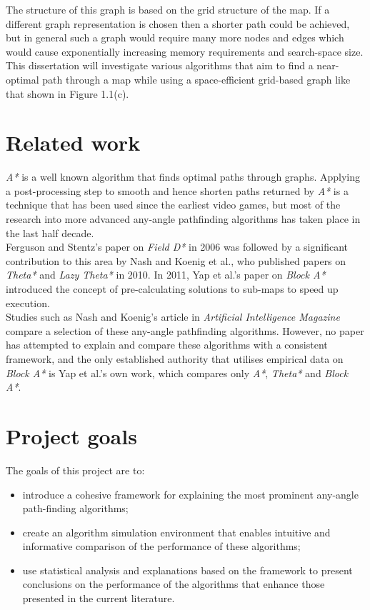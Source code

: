\documentclass[12pt,notitlepage]{report}
\begin{document}
\noindent
The structure of this graph is based on the grid structure of the map. If a different graph representation is chosen then a shorter path could be achieved, but in general such a graph would require many more nodes and edges which would cause exponentially increasing memory requirements and search-space size. This dissertation will investigate various algorithms that aim to find a near-optimal path through a map while using a space-efficient grid-based graph like that shown in Figure 1.1(c).\\

\section{Related work}

{\em A*} is a well known algorithm that finds optimal paths through graphs. Applying a post-processing step to smooth and hence shorten paths returned by {\em A*} is a technique that has been used since the earliest video games\cite{Thorpe84}, but most of the research into more advanced any-angle pathfinding algorithms has taken place in the last half decade. \\

\noindent
Ferguson and Stentz's paper on {\em Field D*}\cite{FergusonStentz06} in 2006 was followed by a significant contribution to this  area by Nash and Koenig et al., who published papers on {\em Theta*}\cite{Daniel10} and {\em Lazy Theta*}\cite{Nash10} in 2010. In 2011, Yap et al.'s paper on {\em Block A*}\cite{Yap11} introduced the concept of pre-calculating solutions to sub-maps to speed up execution.\\

\noindent
Studies such as Nash and Koenig's article in {\em Artificial Intelligence Magazine}\cite{Nash13} compare a selection of these any-angle pathfinding algorithms. However, no paper has attempted to explain and compare these algorithms with a consistent framework, and the only established authority that utilises empirical data on {\em Block A*} is Yap et al.'s own work\cite{Yap11}\cite{Yap11_2}, which compares only {\em A*}, {\em Theta*} and {\em Block A*}.

\section {Project goals}

\noindent
The goals of this project are to:

\begin{itemize}
\item introduce a cohesive framework for explaining the most prominent any-angle path-finding algorithms;
\item create an algorithm simulation environment that enables intuitive and informative comparison of the performance of these algorithms;
\item use statistical analysis and explanations based on the framework to present conclusions on the performance of the algorithms that enhance those presented in the current literature.
\end {itemize}
\end{document}

